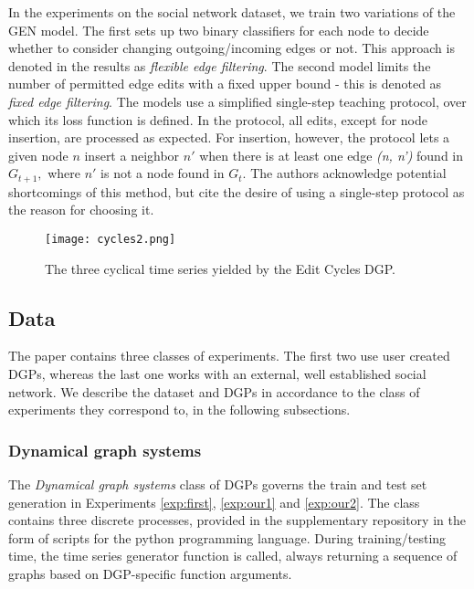 In the experiments on the social network dataset, we train two variations of the GEN model. The first sets up two binary classifiers for each node to decide whether to consider changing outgoing/incoming edges or not. This approach is denoted in the results as \textit{flexible edge filtering}. The second model limits the number of permitted edge edits with a fixed upper bound - this is denoted as \textit{fixed edge filtering}. 
The models use a simplified single-step teaching protocol, over which its loss function is defined. In the protocol, all edits, except for node insertion, are processed as expected. For insertion, however, the protocol lets a given node $n$ insert a neighbor $n'$ when there is at least one edge \textit{(n, n')} found in $G_{t+1},$ where $n'$ is not a node found in $G_{t}.$ The authors acknowledge potential shortcomings of this method, but cite the desire of using a single-step protocol as the reason for choosing it.




\begin{figure}
    \centering
    
    \texttt{[image: cycles2.png]}
    \caption{The three cyclical time series yielded by the Edit Cycles DGP.}
    \label{fig:Cyclical}
\end{figure}
\subsection{Data}
The paper contains three classes of experiments. The first two use user created DGPs, whereas the last one works with an external, well established social network. We describe the dataset and DGPs in accordance to the class of experiments they correspond to, in the following subsections.
\subsubsection{Dynamical graph systems}
\label{sec:DGS}
The \textit{Dynamical graph systems} class of DGPs governs the train and test set generation in Experiments \ref{exp:first}, \ref{exp:our1} and \ref{exp:our2}. The class contains three discrete processes, provided in the supplementary repository in the form of scripts for the python programming language. During training/testing time, the time series generator function is called, always returning a sequence of graphs based on DGP-specific function arguments.

